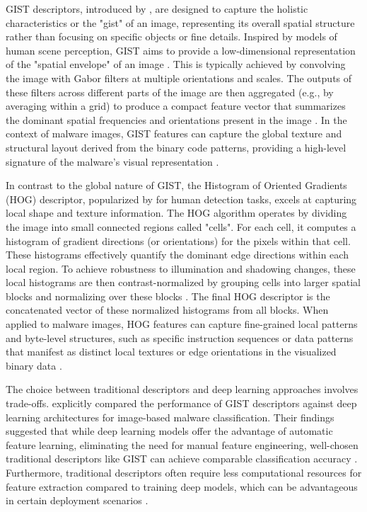 GIST descriptors, introduced by \citet{oliva2001modeling}, are designed to capture the holistic characteristics or the "gist" of an image, representing its overall spatial structure rather than focusing on specific objects or fine details. Inspired by models of human scene perception, GIST aims to provide a low-dimensional representation of the "spatial envelope" of an image \citep{oliva2001modeling}. This is typically achieved by convolving the image with Gabor filters at multiple orientations and scales. The outputs of these filters across different parts of the image are then aggregated (e.g., by averaging within a grid) to produce a compact feature vector that summarizes the dominant spatial frequencies and orientations present in the image \citep{nataraj2011malware, oliva2001modeling}. In the context of malware images, GIST features can capture the global texture and structural layout derived from the binary code patterns, providing a high-level signature of the malware's visual representation \citep{yajamanam2018deep}.

In contrast to the global nature of GIST, the Histogram of Oriented Gradients (HOG) descriptor, popularized by \citet{dalal2005histograms} for human detection tasks, excels at capturing local shape and texture information. The HOG algorithm operates by dividing the image into small connected regions called "cells". For each cell, it computes a histogram of gradient directions (or orientations) for the pixels within that cell. These histograms effectively quantify the dominant edge directions within each local region. To achieve robustness to illumination and shadowing changes, these local histograms are then contrast-normalized by grouping cells into larger spatial blocks and normalizing over these blocks \citep{dalal2005histograms}. The final HOG descriptor is the concatenated vector of these normalized histograms from all blocks. When applied to malware images, HOG features can capture fine-grained local patterns and byte-level structures, such as specific instruction sequences or data patterns that manifest as distinct local textures or edge orientations in the visualized binary data \citep{bozkir2021catch}.

The choice between traditional descriptors and deep learning approaches involves trade-offs. \citet{yajamanam2018deep} explicitly compared the performance of GIST descriptors against deep learning architectures for image-based malware classification. Their findings suggested that while deep learning models offer the advantage of automatic feature learning, eliminating the need for manual feature engineering, well-chosen traditional descriptors like GIST can achieve comparable classification accuracy \citep{yajamanam2018deep}. Furthermore, traditional descriptors often require less computational resources for feature extraction compared to training deep models, which can be advantageous in certain deployment scenarios \citep{yajamanam2018deep}.

